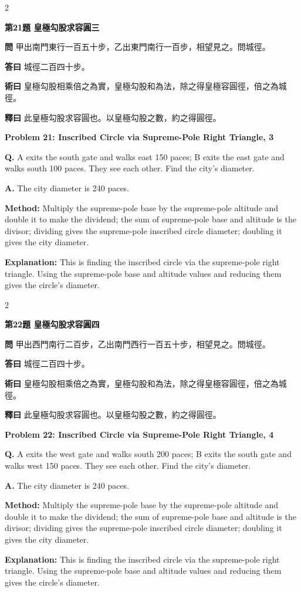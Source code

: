 \documentclass[11pt,a4paper]{article}
\newcommand{\wen}[1]{\noindent\textbf{問} #1\par\smallskip}
\newcommand{\da}[1]{\noindent\textbf{答曰} #1\par\smallskip}
\newcommand{\shu}[1]{\noindent\textbf{術曰} #1\par\smallskip}
\newcommand{\shi}[1]{\noindent\textbf{釋曰} #1\par\smallskip}
\newcommand{\wenE}[1]{\noindent\textbf{Q.} #1\par\smallskip}
\newcommand{\daE}[1]{\noindent\textbf{A.} #1\par\smallskip}
\newcommand{\shuE}[1]{\noindent\textbf{Method:} #1\par\smallskip}
\newcommand{\shiE}[1]{\noindent\textbf{Explanation:} #1\par\smallskip}
\begin{document}
\bigskip

\begin{paracol}{2}

\noindent\textbf{第21題 皇極勾股求容圓三}

\wen{甲出南門東行一百五十步，乙出東門南行一百步，相望見之。問城徑。}
\da{城徑二百四十步。}
\shu{皇極勾股相乘倍之為實，皇極勾股和為法，除之得皇極容圓徑，倍之為城徑。}
\shi{此皇極勾股求容圓也。以皇極勾股之數，約之得圓徑。}

\switchcolumn

\noindent\textbf{Problem 21: Inscribed Circle via Supreme-Pole Right Triangle, 3}

\wenE{A exits the south gate and walks east 150 paces; B exits the east gate and walks south 100 paces. They see each other. Find the city's diameter.}
\daE{The city diameter is 240 paces.}
\shuE{Multiply the supreme-pole base by the supreme-pole altitude and double it to make the dividend; the sum of supreme-pole base and altitude is the divisor; dividing gives the supreme-pole inscribed circle diameter; doubling it gives the city diameter.}
\shiE{This is finding the inscribed circle via the supreme-pole right triangle. Using the supreme-pole base and altitude values and reducing them gives the circle's diameter.}

\end{paracol}

\bigskip

\begin{paracol}{2}

\noindent\textbf{第22題 皇極勾股求容圓四}

\wen{甲出西門南行二百步，乙出南門西行一百五十步，相望見之。問城徑。}
\da{城徑二百四十步。}
\shu{皇極勾股相乘倍之為實，皇極勾股和為法，除之得皇極容圓徑，倍之為城徑。}
\shi{此皇極勾股求容圓也。以皇極勾股之數，約之得圓徑。}

\switchcolumn

\noindent\textbf{Problem 22: Inscribed Circle via Supreme-Pole Right Triangle, 4}

\wenE{A exits the west gate and walks south 200 paces; B exits the south gate and walks west 150 paces. They see each other. Find the city's diameter.}
\daE{The city diameter is 240 paces.}
\shuE{Multiply the supreme-pole base by the supreme-pole altitude and double it to make the dividend; the sum of supreme-pole base and altitude is the divisor; dividing gives the supreme-pole inscribed circle diameter; doubling it gives the city diameter.}
\shiE{This is finding the inscribed circle via the supreme-pole right triangle. Using the supreme-pole base and altitude values and reducing them gives the circle's diameter.}

\end{paracol}
\end{document}
